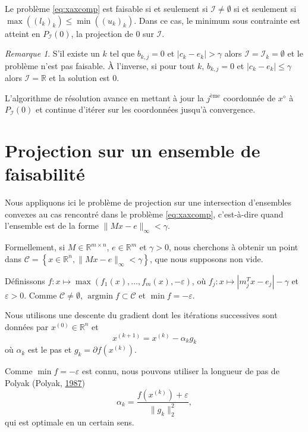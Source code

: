 \documentclass[12pt,a4paper]{reedthesis}
\newcommand \RR {\mathbb{R}}
\DeclareMathOperator*{\argmin}{argmin}
\theoremstyle{definition}
\theoremstyle{definition}
\theoremstyle{definition}
\theoremstyle{remark}
\newtheorem*{remark}{Remarque}
\begin{document}
Le problème \eqref{eq:xaxcomp} est faisable si et seulement si \(\mathcal{I} \neq \emptyset\) si et seulement si \(\max((l_k)_k) \leq \min((u_k)_k)\). Dans ce cas, le minimum sous contrainte est atteint en \(P_\mathcal{I}(0)\), la projection de \(0\) sur \(\mathcal{I}\).
\begin{remark}
{}S'il existe un \(k\) tel que \(b_{k,j} = 0\) et \(\left|c_k-e_k\right| > \gamma\) alors \(\mathcal{I} = \mathcal{I}_k = \emptyset\) et le problème n'est pas faisable. À l'inverse, si pour tout \(k\), \(b_{k,j} = 0\) et \(\left|c_k-e_k\right| \leq \gamma\) alors \(\mathcal{I} = \RR\) et la solution est \(0\).
\end{remark}
L'algorithme de résolution avance en mettant à jour la \(j^{\text{ème}}\) coordonnée de \(x^\diamond\) à \(P_\mathcal{I}(0)\) et continue d'itérer sur les coordonnées jusqu'à convergence.

\hypertarget{proj}{%
\section{Projection sur un ensemble de faisabilité}\label{proj}}

Nous appliquons ici le problème de projection sur une intersection d'ensembles convexes au cas rencontré dans le problème \eqref{eq:xaxcomp}, c'est-à-dire quand l'ensemble est de la forme \(\|Mx-e\|_{\infty} < \gamma\).

Formellement, si \(M \in \RR^{m\times n}\), \(e \in \RR^m\) et \(\gamma > 0\), nous cherchons à obtenir un point dans \(\mathcal{C} = \left\{x \in \RR^n, \|Mx-e\|_{\infty} < \gamma \right\}\), que nous supposons non vide.

Définissons \(f:x\mapsto \max\left(f_1(x), \ldots, f_m(x), -\varepsilon\right)\), où \(f_j: x\mapsto \left|m_j^Tx - e_j\right| - \gamma\) et \(\varepsilon > 0\). Comme \(\mathcal{C}\neq\emptyset\), \(\argmin f \subset \mathcal{C}\) et \(\min f = -\varepsilon\).

Nous utilisons une descente du gradient dont les itérations successives sont données par \(x^{(0)} \in \RR^n\) et
\begin{equation*}
x^{(k+1)} = x^{(k)} - \alpha_kg_k
\end{equation*}
où \(\alpha_k\) est le pas et \(g_k = \partial f\left(x^{(k)}\right)\).

Comme \(\min f = -\varepsilon\) est connu, nous pouvons utiliser la longueur de pas de Polyak (Polyak, \protect\hyperlink{ref-polyak1987introduction}{1987})
\begin{equation*}
\alpha_k = \frac{f\left(x^{(k)}\right) + \varepsilon}{\|g_k\|_2^2},
\end{equation*}
qui est optimale en un certain sens.
\end{document}

